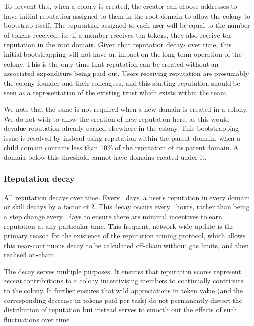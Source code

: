 To prevent this, when a colony is created, the creator can choose addresses to have initial reputation assigned to them in the root domain to allow the colony to bootstrap itself. The reputation assigned to each user will be equal to the number of tokens received, i.e. if a member receives ten tokens, they also receive ten reputation in the root domain. Given that reputation decays over time, this initial bootstrapping will not have an impact on the long-term operation of the colony. This is the only time that reputation can be created without an associated expenditure being paid out. Users receiving reputation are presumably the colony founder and their colleagues, and this starting reputation should be seen as a representation of the existing trust which exists within the team.

We note that the same is not required when a new domain is created in a colony. We do not wish to allow the creation of new reputation here, as this would devalue reputation already earned elsewhere in the colony. This bootstrapping issue is resolved by instead using reputation within the parent domain, when a child domain contains less than 10\% of the reputation of its parent domain. A domain below this threshold cannot have domains created under it.

\subsubsection*{Reputation decay}

All reputation decays over time. Every \repdecayduration\ days, a user's reputation in every domain or skill decays by a factor of 2. This decay occurs every \miningcycleduration\ hours, rather than being a step change every \repdecayduration\ days to ensure there are minimal incentives to earn reputation at any particular time. This frequent, network-wide update is the primary reason for the existence of the reputation mining protocol, which allows this near-continuous decay to be calculated off-chain without gas limits, and then realised on-chain.

The decay serves multiple purposes. It ensures that reputation scores represent \emph{recent} contributions to a colony incentivising members to continually contribute to the colony. It further ensures that wild appreciations in token value (and the corresponding decrease in tokens paid per task) do not permanently distort the distribution of reputation but instead serves to smooth out the effects of such fluctuations over time. \\

